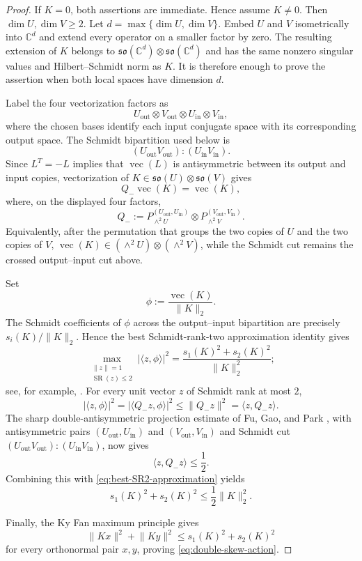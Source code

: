\documentclass[11pt,reqno]{amsart}
\theoremstyle{remark}
\DeclareMathOperator{\SR}{SR}
\newcommand{\ip}[2]{\langle #1,#2\rangle}
\newcommand{\norm}[1]{\lVert #1\rVert}
\newcommand{\abs}[1]{\lvert #1\rvert}
\newcommand{\C}{\mathbb C}
\begin{document}
\begin{proof}
If $K=0$, both assertions are immediate. Hence assume $K\ne0$. Then
$\dim U,\dim V\ge2$. Let $d=\max\{\dim U,\dim V\}$. Embed $U$ and
$V$ isometrically into
$\C^d$ and extend every operator on a smaller factor by zero. The
resulting extension of $K$ belongs to
$\mathfrak{so}(\C^d)\otimes\mathfrak{so}(\C^d)$ and has the same
nonzero singular values and Hilbert--Schmidt norm as $K$. It is
therefore enough to prove the assertion when both local spaces have
dimension $d$.

Label the four vectorization factors as
\[
    U_{\mathrm{out}}\otimes V_{\mathrm{out}}
    \otimes U_{\mathrm{in}}\otimes V_{\mathrm{in}},
\]
where the chosen bases identify each input conjugate space with its
corresponding output space. The Schmidt bipartition used below is
\[
    (U_{\mathrm{out}}V_{\mathrm{out}})
    :
    (U_{\mathrm{in}}V_{\mathrm{in}}).
\]
Since $L^T=-L$ implies that $\operatorname{vec}(L)$ is antisymmetric
between its output and input copies, vectorization of
$K\in\mathfrak{so}(U)\otimes\mathfrak{so}(V)$ gives
\[
    Q_-\operatorname{vec}(K)=\operatorname{vec}(K),
\]
where, on the displayed four factors,
\[
    Q_-
    :=P_{\wedge^2 U}^{(U_{\mathrm{out}},U_{\mathrm{in}})}
      \otimes
      P_{\wedge^2 V}^{(V_{\mathrm{out}},V_{\mathrm{in}})}.
\]
Equivalently, after the permutation that groups the two copies of $U$
and the two copies of $V$,
$\operatorname{vec}(K)\in(\wedge^2U)\otimes(\wedge^2V)$, while the
Schmidt cut remains the crossed output--input cut above.

Set
\[
    \phi:=\frac{\operatorname{vec}(K)}{\norm{K}_2}.
\]
The Schmidt coefficients of $\phi$ across the output--input
bipartition are precisely $s_i(K)/\norm{K}_2$. Hence the best
Schmidt-rank-two approximation identity gives
\begin{equation}
\label{eq:best-SR2-approximation}
    \max_{\substack{\norm{z}=1\\ \SR(z)\le2}}
    \abs{\ip{z}{\phi}}^2
    =
    \frac{s_1(K)^2+s_2(K)^2}{\norm{K}_2^2};
\end{equation}
see, for example, \cite[Theorem 3.3]{JohnstonKribs2010}.
For every unit vector $z$ of Schmidt rank at most $2$,
\[
    \abs{\ip{z}{\phi}}^2
    =\abs{\ip{Q_-z}{\phi}}^2
    \le \norm{Q_-z}^2
    =\ip{z}{Q_-z}.
\]
The sharp double-antisymmetric projection estimate of Fu, Gao, and
Park \cite[Theorem 2.4]{fu2026solution2copydistillabilitywerner},
with antisymmetric pairs
$(U_{\mathrm{out}},U_{\mathrm{in}})$ and
$(V_{\mathrm{out}},V_{\mathrm{in}})$ and Schmidt cut
$(U_{\mathrm{out}}V_{\mathrm{out}}):(U_{\mathrm{in}}V_{\mathrm{in}})$,
now gives
\[
    \ip{z}{Q_-z}\le\frac12.
\]
Combining this with \cref{eq:best-SR2-approximation} yields
\[
    s_1(K)^2+s_2(K)^2\le\frac12\norm{K}_2^2.
\]

Finally, the Ky Fan maximum principle gives
\[
    \norm{Kx}^2+\norm{Ky}^2
    \le s_1(K)^2+s_2(K)^2
\]
for every orthonormal pair $x,y$, proving
\cref{eq:double-skew-action}.
\end{proof}
\end{document}
